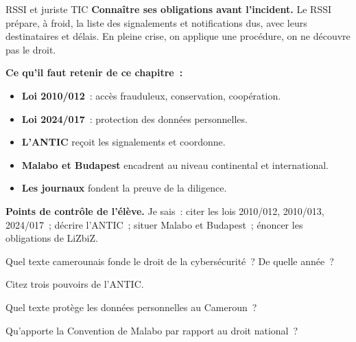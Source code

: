 \begin{boxmetier}{RSSI et juriste TIC}
\textbf{Connaître ses obligations avant l'incident.} Le RSSI prépare, à
froid, la liste des signalements et notifications dus, avec leurs
destinataires et délais. En pleine crise, on applique une procédure, on ne
découvre pas le droit.
\end{boxmetier}

\separateur

\begin{boxresume}
\textbf{Ce qu'il faut retenir de ce chapitre~:}
\begin{itemize}
    \item \textbf{Loi 2010/012}~: accès frauduleux, conservation, coopération.
    \item \textbf{Loi 2024/017}~: protection des données personnelles.
    \item \textbf{L'ANTIC} reçoit les signalements et coordonne.
    \item \textbf{Malabo et Budapest} encadrent au niveau continental et
          international.
    \item \textbf{Les journaux} fondent la preuve de la diligence.
\end{itemize}
\end{boxresume}

\begin{boxinfo}
\textbf{Points de contrôle de l'élève.} Je sais~: citer les lois 2010/012,
2010/013, 2024/017~; décrire l'ANTIC~; situer Malabo et Budapest~; énoncer
les obligations de LiZbiZ.
\end{boxinfo}

\bigskip

\begin{boxexo}[title={\ding{45}\quad Exercice~9.1. La loi fondatrice \niveaubase}]
Quel texte camerounais fonde le droit de la cybersécurité~? De quelle année~?
\end{boxexo}

\begin{boxexo}[title={\ding{45}\quad Exercice~9.2. L'ANTIC \niveaubase}]
Citez trois pouvoirs de l'ANTIC.
\end{boxexo}

\begin{boxexo}[title={\ding{45}\quad Exercice~9.3. Données \niveaubase}]
Quel texte protège les données personnelles au Cameroun~?
\end{boxexo}

\begin{boxexo}[title={\ding{45}\quad Exercice~9.4. Malabo \niveaumoyen}]
Qu'apporte la Convention de Malabo par rapport au droit national~?
\end{boxexo}

